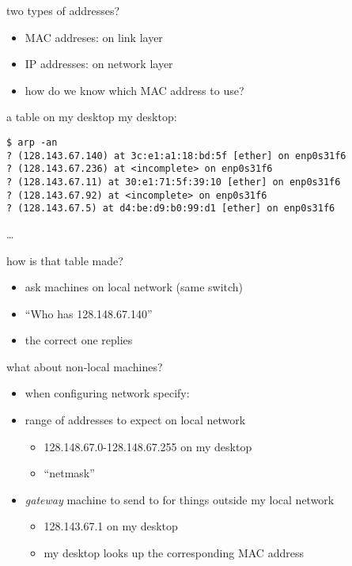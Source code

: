 \begin{frame}{two types of addresses?}
    \begin{itemize}
    \item MAC addreses: on link layer
    \item IP addresses: on network layer
    \vspace{.5cm}
    \item how do we know which MAC address to use?
    \end{itemize}
\end{frame}

\begin{frame}[fragile]{a table on my desktop}
my desktop: \\
\begin{Verbatim}[fontsize=\fontsize{9}{10}\selectfont]
$ arp -an
? (128.143.67.140) at 3c:e1:a1:18:bd:5f [ether] on enp0s31f6
? (128.143.67.236) at <incomplete> on enp0s31f6
? (128.143.67.11) at 30:e1:71:5f:39:10 [ether] on enp0s31f6
? (128.143.67.92) at <incomplete> on enp0s31f6
? (128.143.67.5) at d4:be:d9:b0:99:d1 [ether] on enp0s31f6
\end{Verbatim}
\ldots
\end{frame}

\begin{frame}{how is that table made?}
    \begin{itemize}
    \item ask machines on local network (same switch)
    \item ``Who has 128.148.67.140''
    \item the correct one replies
    \end{itemize}
\end{frame}

\begin{frame}{what about non-local machines?}
    \begin{itemize}
    \item when configuring network specify:
    \vspace{.5cm}
    \item range of addresses to expect on local network 
        \begin{itemize}
        \item 128.148.67.0-128.148.67.255 on my desktop
        \item ``netmask''
        \end{itemize}
    \item \textit{gateway} machine to send to for things outside my local network
        \begin{itemize}
        \item 128.143.67.1 on my desktop
        \item my desktop looks up the corresponding MAC address
        \end{itemize}
    \end{itemize}
\end{frame}

